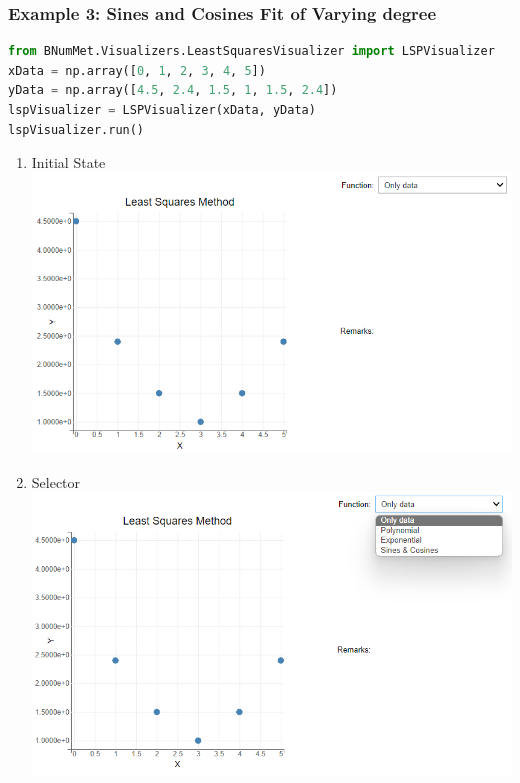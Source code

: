 \subsubsection{Example 3: Sines and Cosines Fit of Varying degree}{
\begin{lstlisting}[language=Python]
from BNumMet.Visualizers.LeastSquaresVisualizer import LSPVisualizer
xData = np.array([0, 1, 2, 3, 4, 5])
yData = np.array([4.5, 2.4, 1.5, 1, 1.5, 2.4])
lspVisualizer = LSPVisualizer(xData, yData)
lspVisualizer.run()
\end{lstlisting}

\begin{enumerate}
    \item Initial State\\
    \includegraphics[scale=0.7]{Include/Images/Thesis/Documentation/Visualizers/LeastSquares/Example 1/Example 1 - 00 - Initial State.png}
    \item Selector\\
    \includegraphics[scale=0.7]{Include/Images/Thesis/Documentation/Visualizers/LeastSquares/Example 1/Example 1 - 00 - Selector.png}

\end{enumerate}}
